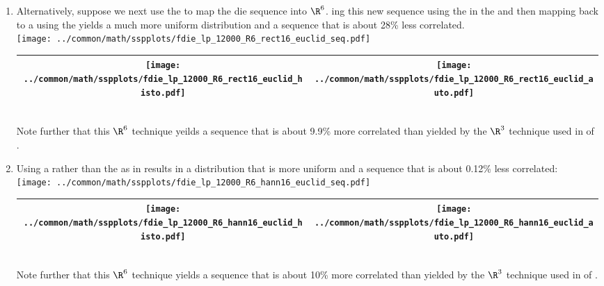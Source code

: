 \begin{example}
\begin{enumerate}
  \item \label{item:fdie_lp_R6_rect16_euclid}
        Alternatively, suppose we next 
        use the  
        to map the die sequence into $\R^6$.
        ing this new sequence using the 
        in the   
        and then mapping back to a  %
        using the  yields a much more uniform distribution and 
        a sequence that is about 28\% less correlated.
        \\\texttt{[image: ../common/math/sspplots/fdie\_lp\_12000\_R6\_rect16\_euclid\_seq.pdf]}%
     \\\begin{tabular}{|>{\scs}c|>{\scs}c|}
          \hline
          \texttt{[image: ../common/math/sspplots/fdie\_lp\_12000\_R6\_rect16\_euclid\_histo.pdf]}%
         &\texttt{[image: ../common/math/sspplots/fdie\_lp\_12000\_R6\_rect16\_euclid\_auto.pdf]}
        \\\hline
     \end{tabular}\\
     Note further that this $\R^6$ technique yeilds a sequence that is about 9.9\% more correlated than 
     yielded by the $\R^3$ technique
     used in  of .

  \item \label{item:fdie_lp_R6_hann16_euclid}
        Using a  rather than the 
         as in 
        results in a distribution that is more uniform and a sequence that is about 0.12\% less correlated:
        \\\texttt{[image: ../common/math/sspplots/fdie\_lp\_12000\_R6\_hann16\_euclid\_seq.pdf]}
     \\\begin{tabular}{|>{\scs}c|>{\scs}c|}
          \hline
          \texttt{[image: ../common/math/sspplots/fdie\_lp\_12000\_R6\_hann16\_euclid\_histo.pdf]}%
         &\texttt{[image: ../common/math/sspplots/fdie\_lp\_12000\_R6\_hann16\_euclid\_auto.pdf]}
        \\\hline
     \end{tabular}\\
     Note further that this $\R^6$ technique yields a sequence that is about 10\% more correlated than 
     yielded by the $\R^3$ technique
     used in  of .


\end{enumerate}
\end{example}
